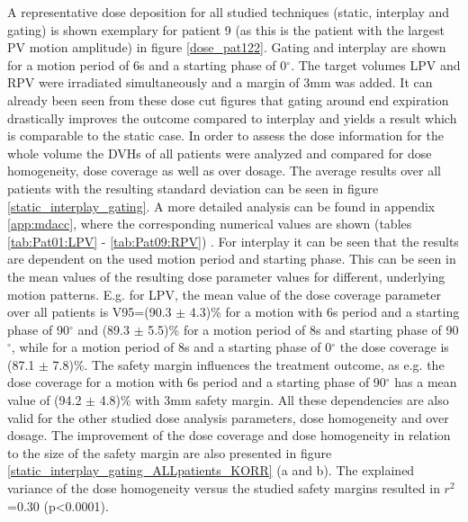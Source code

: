 \documentclass[type=dr, dr=rernat, accentcolor=tud7b,colorbacktitle, bigchapter, openright, twoside, 12pt ]{tudthesis}
\begin{document}
A representative dose deposition for all studied techniques (static, interplay and gating) is shown exemplary for patient 9 (as this is the 
patient with the largest PV motion amplitude) in figure \ref{dose_pat122}. Gating and interplay are shown for a motion period of 6s 
and a starting phase of 0$^{\circ}$. The target volumes LPV and RPV were irradiated simultaneously and a margin of 3mm was added. It can 
already been seen from these dose cut figures that gating around end expiration drastically improves the outcome compared to interplay and yields 
a result which is comparable to the static case.\newline
\newline
In order to assess the dose information for the whole volume the DVHs of all patients were analyzed and compared for dose homogeneity, 
dose coverage as well as over dosage. The average results over all patients with the resulting standard deviation can be seen in 
figure \ref{static_interplay_gating}. A more detailed analysis can be found in appendix \ref{app:mdacc}, where the corresponding numerical 
values are shown (tables \ref{tab:Pat01:LPV} - \ref{tab:Pat09:RPV}) .\newline
\newline
For interplay it can be seen that the results are dependent on the used motion period and starting phase. This can be seen in the 
mean values of the resulting dose parameter values for different, underlying motion patterns. E.g. for LPV, the mean value of the dose 
coverage parameter over all patients is V95=(90.3 $\pm$ 4.3)\% for a motion with 6s period and a starting phase of 90$^{\circ}$ and 
(89.3 $\pm$ 5.5)\% for a motion period of 8s and starting phase of 90$^{\circ}$, while for a motion period of 8s 
and a starting phase of 0$^{\circ}$ the dose coverage is (87.1 $\pm$ 7.8)\%. 
The safety margin influences the treatment outcome, as e.g. the dose coverage for a motion with 6s period 
and a starting phase of 90$^{\circ}$ has a mean value of (94.2 $\pm$ 4.8)\% with 3mm safety margin. All these dependencies are also valid for 
the other studied dose analysis parameters, dose homogeneity and over dosage. The improvement of the dose coverage and dose homogeneity 
in relation to the size of the safety margin are also presented in figure \ref{static_interplay_gating_ALLpatients_KORR} (a and b). 
The explained variance of the dose homogeneity versus the studied safety margins resulted in $r^{2}$=0.30 (p<0.0001).\newline 
\newline
\end{document}
